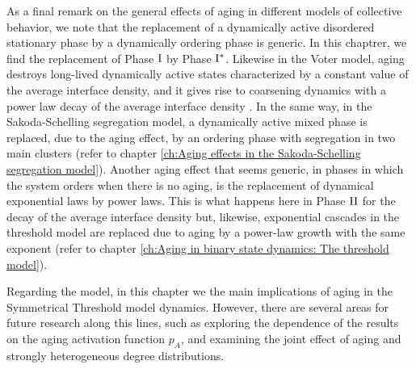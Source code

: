 As a final remark on the general effects of aging in different models of collective behavior, we note that the replacement of a dynamically active disordered stationary phase by a dynamically ordering phase is generic. In this chaptrer, we find the replacement of Phase ${\rm I}$ by Phase ${\rm I}^{*}$. Likewise in the Voter model, aging destroys long-lived dynamically active states characterized by a constant value of the average interface density, and it gives rise to coarsening dynamics with a power law decay of the average interface density \cite{fernandez-gracia-2011}. In the same way, in the Sakoda-Schelling segregation model, a dynamically active mixed phase is replaced, due to the aging effect, by an ordering phase with segregation in two main clusters (refer to chapter \ref{ch:Aging effects in the Sakoda-Schelling segregation model}). 
Another aging effect that seems generic, in phases in which the system orders when there is no aging, is the replacement of dynamical exponential laws by power laws. This is what happens here in  Phase ${\rm II}$ for the decay of the average interface density but, likewise, exponential cascades in the threshold model are replaced due to aging by a power-law growth with the same exponent (refer to chapter \ref{ch:Aging in binary state dynamics: The threshold model}).

Regarding the model,  in this chapter we the main implications of aging in the Symmetrical Threshold model dynamics. However, there are several areas for future research along this lines, such as exploring the dependence of the results on the aging activation function $p_A$, and examining the joint effect of aging and strongly heterogeneous degree distributions.